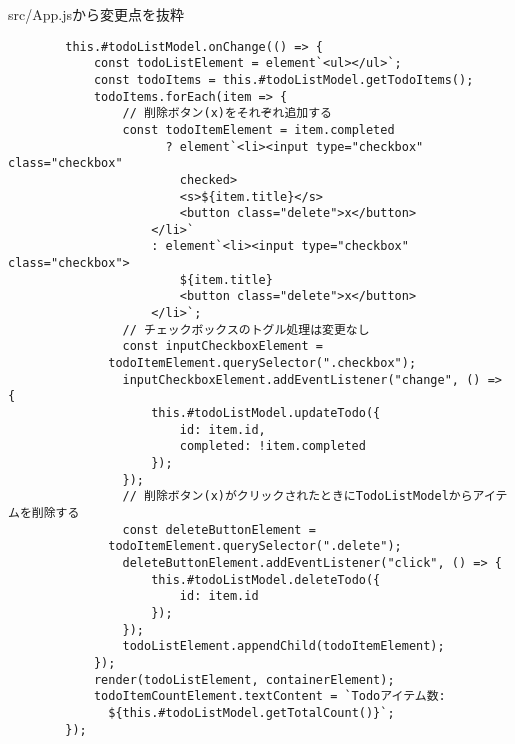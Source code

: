 \begin{listtitle}
src/App.jsから変更点を抜粋
\end{listtitle}
\begin{lstlisting}
        this.#todoListModel.onChange(() => {
            const todoListElement = element`<ul></ul>`;
            const todoItems = this.#todoListModel.getTodoItems();
            todoItems.forEach(item => {
                // 削除ボタン(x)をそれぞれ追加する
                const todoItemElement = item.completed
                      ? element`<li><input type="checkbox" class="checkbox"
                        checked>
                        <s>${item.title}</s>
                        <button class="delete">x</button>
                    </li>`
                    : element`<li><input type="checkbox" class="checkbox">
                        ${item.title}
                        <button class="delete">x</button>
                    </li>`;
                // チェックボックスのトグル処理は変更なし
                const inputCheckboxElement =
		      todoItemElement.querySelector(".checkbox");
                inputCheckboxElement.addEventListener("change", () => {
                    this.#todoListModel.updateTodo({
                        id: item.id,
                        completed: !item.completed
                    });
                });
                // 削除ボタン(x)がクリックされたときにTodoListModelからアイテムを削除する
                const deleteButtonElement =
		      todoItemElement.querySelector(".delete");
                deleteButtonElement.addEventListener("click", () => {
                    this.#todoListModel.deleteTodo({
                        id: item.id
                    });
                });
                todoListElement.appendChild(todoItemElement);
            });
            render(todoListElement, containerElement);
            todoItemCountElement.textContent = `Todoアイテム数:
              ${this.#todoListModel.getTotalCount()}`;
        });
\end{lstlisting}
\listend
